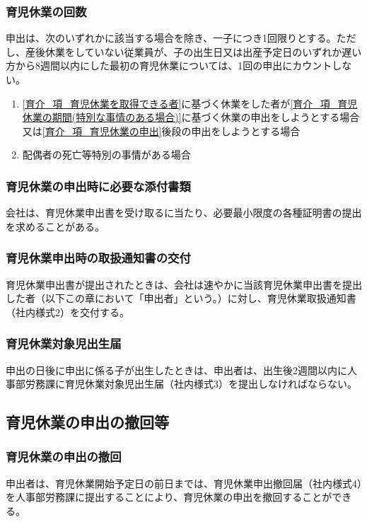 \documentclass{jsarticle}
\begin{document}
\subsubsection{育児休業の回数}
\label{育介_項_育児休業の回数}
申出は、次のいずれかに該当する場合を除き、一子につき1回限りとする。ただし、産後休業をしていない従業員が、子の出生日又は出産予定日のいずれか遅い方から8週間以内にした最初の育児休業については、1回の申出にカウントしない。
\begin{enumerate}
  \item \ref{育介_項_育児休業を取得できる者}に基づく休業をした者が\ref{育介_項_育児休業の期間(特別な事情のある場合)}に基づく休業の申出をしようとする場合又は\ref{育介_項_育児休業の申出}後段の申出をしようとする場合
  \item 配偶者の死亡等特別の事情がある場合 
\end{enumerate}

\subsubsection{育児休業の申出時に必要な添付書類}
\label{育介_項_育児休業の申出時に必要な添付書類}
会社は、育児休業申出書を受け取るに当たり、必要最小限度の各種証明書の提出を求めることがある。

\subsubsection{育児休業申出時の取扱通知書の交付}
\label{育介_項_育児休業申出時の取扱通知書の交付}
育児休業申出書が提出されたときは、会社は速やかに当該育児休業申出書を提出した者（以下この章において「申出者」という。）に対し、育児休業取扱通知書（社内様式2）を交付する。

\subsubsection{育児休業対象児出生届}
\label{育介_項_育児休業対象児出生届}
申出の日後に申出に係る子が出生したときは、申出者は、出生後2週間以内に人事部労務課に育児休業対象児出生届（社内様式3）を提出しなければならない。

\subsection{育児休業の申出の撤回等}
\label{育介_条_育児休業の申出の撤回等}

\subsubsection{育児休業の申出の撤回}
\label{育介_項_育児休業の申出の撤回}
申出者は、育児休業開始予定日の前日までは、育児休業申出撤回届（社内様式4）を人事部労務課に提出することにより、育児休業の申出を撤回することができる。 
\end{document}
